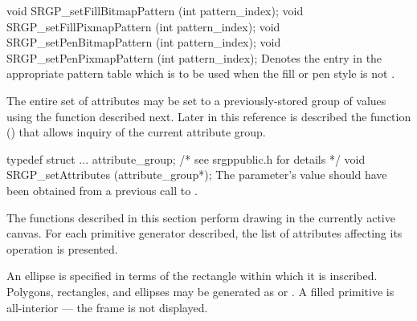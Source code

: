 \nextsynopsis
void SRGP_setFillBitmapPattern (int pattern_index);
void SRGP_setFillPixmapPattern (int pattern_index);
void SRGP_setPenBitmapPattern (int pattern_index);
void SRGP_setPenPixmapPattern (int pattern_index);
\endsynopsis
Denotes the entry in the appropriate pattern table which is to be used when the
fill or pen style is not .  

\newpar
The entire set of attributes may be set to a previously-stored group of values
using the function described next.  Later in this reference is described the
function () that allows inquiry of the current
attribute group.

\newsynopsis
typedef struct {...} attribute_group;   /* see srgppublic.h for details */
void SRGP_setAttributes (attribute_group*);
\endsynopsis
The parameter's value should have been obtained from a
previous call to .






The functions described in this section perform drawing in the currently active
canvas.  For each primitive generator described, the list of attributes
affecting its operation is presented.

\newpar
An ellipse is specified in terms of the rectangle within which it is inscribed.
Polygons, rectangles, and ellipses may be generated as  or
.  A filled primitive is all-interior --- the frame is not
displayed.



